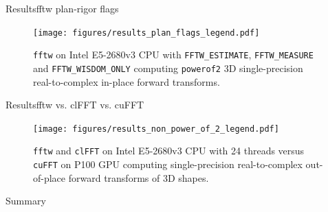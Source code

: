 \documentclass[t,11pt,hyperref={
  pdftitle = {gearshifft},
  pdfsubject = {gearshifft},
  pdfborder={0 0 0},
  colorlinks=true,
  urlcolor=red,
  citecolor=red,
  linkcolor=red,
  pdfauthor={Peter Steinbach, Matthias Werner}
  }
]{beamer}
\def\resetbeamertemplate{\setbeamertemplate{background canvas}{ }}
\newcommand{\fftw}{\texttt{fftw}}
\newcommand{\cufft}{\texttt{cuFFT}}
\newcommand{\clfft}{\texttt{clFFT}}
\newcommand{\mc}[1]{\lstinline!#1!}
\begin{document}
\begin{frame}{Results}{fftw plan-rigor flags}
\begin{figure}[!htbp]
  \centering
  \texttt{[image: figures/results\_plan\_flags\_legend.pdf]}\\[-.5em]
  \hfill
  \caption{\fftw{} on Intel E5-2680v3 CPU with \mc{FFTW_ESTIMATE}, \mc{FFTW_MEASURE} and \mc{FFTW_WISDOM_ONLY} computing \texttt{powerof2} 3D single-precision real-to-complex in-place forward transforms.}
  \label{fig:fftw_plan_flags}
\end{figure}
\end{frame}


\begin{frame}{Results}{fftw vs. clFFT vs. cuFFT}
\begin{figure}[!tbp]
  \centering
  \texttt{[image: figures/results\_non\_power\_of\_2\_legend.pdf]}\\[-1em]
  \hfill
  \caption{\fftw{} and \clfft{} on Intel E5-2680v3 CPU with 24 threads versus \cufft{} on P100 GPU computing single-precision real-to-complex out-of-place forward transforms of 3D shapes.}
  \label{fig:non_power_of_2}
\end{figure}
\end{frame}

\begin{frame}[plain]
\end{frame}

\resetbeamertemplate

\begin{frame}{Summary}{}
\end{frame}
\end{document}
